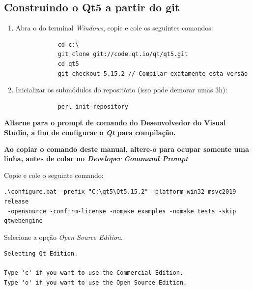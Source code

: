\documentclass[a4paper,11pt]{article}
\newcommand{\qt}{\textit{Qt}}
\newcommand{\windows}{\textit{Windows}}
\newcommand{\cautionbox}[1]{
	\vskip 5mm
	\begin{leftbar}
		\textbf{#1}
	\end{leftbar}
	\vskip 5mm
}
\begin{document}
\subsection*{Construindo o Qt5 a partir do git}
\begin{enumerate}
	\item Abra o do terminal \windows{}, copie e cole os seguintes comandos:
	\begin{mdframed}
		\begin{verbatim}
			cd c:\
			git clone git://code.qt.io/qt/qt5.git
			cd qt5
			git checkout 5.15.2 // Compilar exatamente esta versão
		\end{verbatim}
	\end{mdframed}
	
	\item Inicializar os submódulos do repositório (isso pode demorar umas 3h):
	\begin{mdframed}
		\begin{verbatim}
			perl init-repository
		\end{verbatim}
	\end{mdframed}
\end{enumerate}

\cautionbox{
Alterne para o prompt de comando do Desenvolvedor do Visual Studio, a fim de configurar o \qt{} para compilação.
}

\cautionbox{\color{orange}Ao copiar o comando deste manual, altere-o para ocupar somente uma linha, antes de colar no \textit{Developer Command Prompt}}

Copie e cole o seguinte comando:
\small
\begin{mdframed}
\begin{verbatim}
.\configure.bat -prefix "C:\qt5\Qt5.15.2" -platform win32-msvc2019 release
 -opensource -confirm-license -nomake examples -nomake tests -skip qtwebengine
\end{verbatim}
\end{mdframed}
\normalsize

\newpage

Selecione a opção \textit{Open Source Edition}.
\begin{mdframed}
\begin{verbatim}
Selecting Qt Edition.

Type 'c' if you want to use the Commercial Edition.
Type 'o' if you want to use the Open Source Edition.
\end{verbatim}
\end{mdframed}
\end{document}
